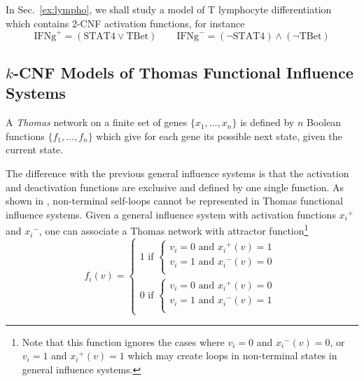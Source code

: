 \documentclass{llncs}
\begin{document}
\begin{example}
   In Sec.~\ref{ex:lympho}, we shall study a model of T lymphocyte differentiation which contains 2-CNF activation functions, for instance
   \[\text{IFNg}^+=(\text{STAT4}\vee \text{TBet})\qquad
   \text{IFNg}^-=(\neg \text{STAT4})\wedge(\neg \text{TBet})\]
\end{example}

\subsection{$k$-CNF Models of Thomas Functional Influence Systems}


\begin{definition}
   A \emph{Thomas} network on a finite set of genes $\{x_1,\dots,x_n\}$
   is defined by  $n$ Boolean functions $\{f_1,\dots,f_n\}$ which give for each gene its
   possible next state, given the current state.
\end{definition}

The difference with the previous general influence systems
is that the activation and deactivation functions are exclusive and defined by one single function.
As shown in \cite{FMRS16cmsb}, non-terminal self-loops cannot be represented in Thomas functional influence systems.
Given a general influence system with activation functions ${x_i}^+$ and ${x_i}^-$, one can associate a Thomas network 
with attractor function\footnote{Note that this function ignores the cases where $v_i = 0$ and ${x_i}^-(v) =0$, or $v_i=1$ and ${x_i}^+(v)=1$
which may create loops in non-terminal states in general influence systems.}
\[
f_i(v) = \left\{\begin{array}{l}
1 \text{ if } \left\{\begin{array}{l}
v_i = 0 \text{ and } {x_i}^+(v) = 1\\
v_i = 1 \text{ and } {x_i}^-(v) = 0 \\
\end{array}\right.\\[1em]
0 \text{ if } \left\{\begin{array}{l}
v_i = 0 \text{ and } {x_i}^+(v) = 0\\
v_i = 1 \text{ and } {x_i}^-(v) = 1\\
\end{array}\right.
\end{array}\right.
\]
\end{document}
